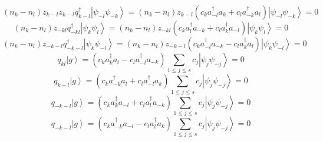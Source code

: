 \documentclass[aps,preprint]{revtex4}%
\begin{document}
\begin{equation}
\left(  n_{k}-n_{l}\right)  z_{k-l}z_{k-l}q_{k-l}^{\dagger}\left\vert
\psi_{-l}\psi_{-k}\right\rangle =\left(  n_{k}-n_{l}\right)  z_{k-l}\left(
c_{k}a_{-l}^{\dagger}a_{k}+c_{l}a_{-k}^{\dagger}a_{l}\right)  \left\vert
\psi_{-l}\psi_{-k}\right\rangle =0
\end{equation}%
\begin{equation}
\left(  n_{k}-n_{l}\right)  z_{-kl}q_{-kl}^{\dagger}\left\vert \psi_{k}%
\psi_{l}\right\rangle =\left(  n_{k}-n_{l}\right)  z_{-kl}\left(  c_{k}%
a_{l}^{\dagger}a_{-k}+c_{l}a_{k}^{\dagger}a_{-l}\right)  \left\vert \psi
_{k}\psi_{l}\right\rangle =0
\end{equation}%
\begin{equation}
\left(  n_{k}-n_{l}\right)  z_{-k-l}q_{-k-l}^{\dagger}\left\vert \psi_{k}%
\psi_{-l}\right\rangle =\left(  n_{k}-n_{l}\right)  z_{-k-l}\left(
c_{k}a_{-l}^{\dagger}a_{-k}-c_{l}a_{k}^{\dagger}a_{l}\right)  \left\vert
\psi_{k}\psi_{-l}\right\rangle =0
\end{equation}%
\begin{equation}
q_{kl}\left\vert g\right\rangle =\left(  c_{k}a_{k}^{\dagger}a_{l}-c_{l}%
a_{-l}^{\dagger}a_{-k}\right)  \sum_{1\leq j\leq s}c_{j}\left\vert \psi
_{j}\psi_{-j}\right\rangle =0
\end{equation}%
\begin{equation}
q_{k-l}\left\vert g\right\rangle =\left(  c_{k}a_{-k}^{\dagger}a_{l}%
+c_{l}a_{-l}^{\dagger}a_{k}\right)  \sum_{1\leq j\leq s}c_{j}\left\vert
\psi_{j}\psi_{-j}\right\rangle =0
\end{equation}%
\begin{equation}
q_{-k-l}\left\vert g\right\rangle =\left(  c_{k}a_{k}^{\dagger}a_{-l}%
+c_{l}a_{l}^{\dagger}a_{-k}\right)  \sum_{1\leq j\leq s}c_{j}\left\vert
\psi_{j}\psi_{-j}\right\rangle =0
\end{equation}%
\begin{equation}
q_{-k-l}\left\vert g\right\rangle =\left(  c_{k}a_{-k}^{\dagger}a_{-l}%
-c_{l}a_{l}^{\dagger}a_{k}\right)  \sum_{1\leq j\leq s}c_{j}\left\vert
\psi_{j}\psi_{-j}\right\rangle =0
\end{equation}%
\end{document}
